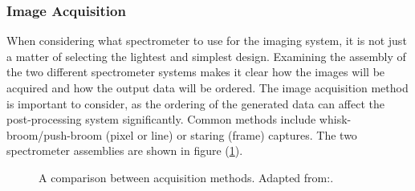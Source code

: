 \subsubsection*{Image Acquisition}
When considering what spectrometer to use for the imaging system, it is not just a  matter of selecting the lightest and simplest design. Examining the assembly of the two different spectrometer systems makes it clear how the images will be acquired and how the output data will be ordered. The image acquisition method is important to consider, as the ordering of the generated data can affect the post-processing system significantly. Common methods include whisk-broom/push-broom (pixel or line) or staring (frame) captures. The two spectrometer assemblies are shown in figure (\ref{fig:spec_acquisition_compare}). 
\begin{figure}[htb]
    \centering
    \captionsetup[subfigure]{width=0.45\textwidth}
    \caption{A comparison between acquisition methods. Adapted from:\cite{nieke1997a}.}\label{fig:spec_acquisition_compare}
\end{figure}
